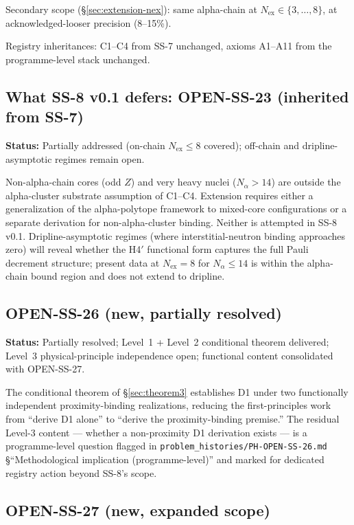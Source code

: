\documentclass[11pt,letterpaper]{article}
\theoremstyle{definition}
\newcommand{\Nalpha}{N_\alpha}
\newcommand{\Nex}{N_{\text{ex}}}
\begin{document}
Secondary scope (\S\ref{sec:extension-nex}): same alpha-chain at $\Nex \in \{3, \ldots, 8\}$, at acknowledged-looser precision (8--15\%).

Registry inheritances: C1--C4 from SS-7 unchanged, axioms A1--A11 from the programme-level stack unchanged.

\subsection{What SS-8 v0.1 defers: OPEN-SS-23 (inherited from SS-7)}
\label{sec:open-ss-23}

\textbf{Status:} Partially addressed (on-chain $\Nex \leq 8$ covered); off-chain and dripline-asymptotic regimes remain open.

Non-alpha-chain cores (odd $Z$) and very heavy nuclei ($\Nalpha > 14$) are outside the alpha-cluster substrate assumption of C1--C4. Extension requires either a generalization of the alpha-polytope framework to mixed-core configurations or a separate derivation for non-alpha-cluster binding. Neither is attempted in SS-8 v0.1. Dripline-asymptotic regimes (where interstitial-neutron binding approaches zero) will reveal whether the H4$'$ functional form captures the full Pauli decrement structure; present data at $\Nex = 8$ for $\Nalpha \leq 14$ is within the alpha-chain bound region and does not extend to dripline.

\subsection{OPEN-SS-26 (new, partially resolved)}
\label{sec:open-ss-26}

\textbf{Status:} Partially resolved; Level~1 + Level~2 conditional theorem delivered; Level~3 physical-principle independence open; functional content consolidated with OPEN-SS-27.

The conditional theorem of \S\ref{sec:theorem3} establishes D1 under two functionally independent proximity-binding realizations, reducing the first-principles work from ``derive D1 alone'' to ``derive the proximity-binding premise.'' The residual Level-3 content --- whether a non-proximity D1 derivation exists --- is a programme-level question flagged in \texttt{problem\_histories/PH-OPEN-SS-26.md} \S``Methodological implication (programme-level)'' and marked for dedicated registry action beyond SS-8's scope.

\subsection{OPEN-SS-27 (new, expanded scope)}
\label{sec:open-ss-27}
\end{document}
